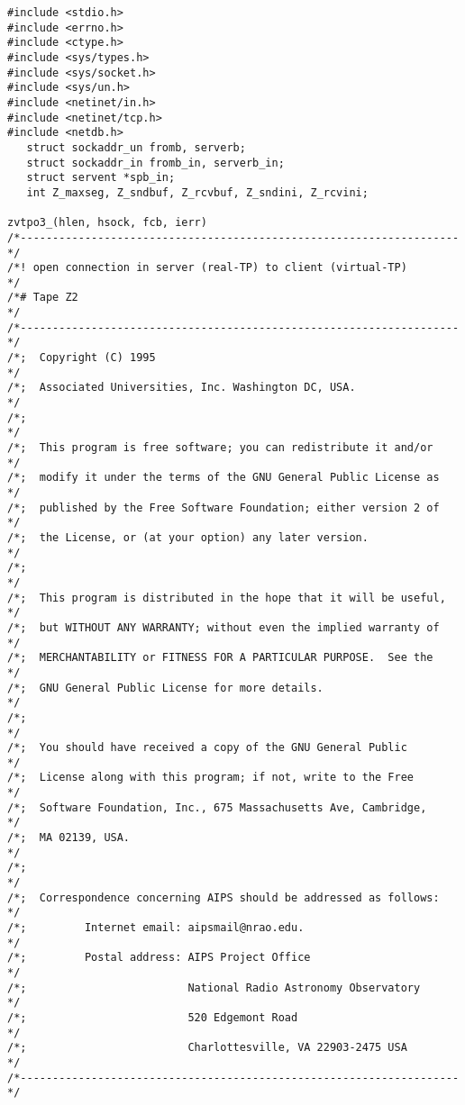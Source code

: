 \begin{center}
\begin{verbatim}
#include <stdio.h>
#include <errno.h>
#include <ctype.h>
#include <sys/types.h>
#include <sys/socket.h>
#include <sys/un.h>
#include <netinet/in.h>
#include <netinet/tcp.h>
#include <netdb.h>
   struct sockaddr_un fromb, serverb;
   struct sockaddr_in fromb_in, serverb_in;
   struct servent *spb_in;
   int Z_maxseg, Z_sndbuf, Z_rcvbuf, Z_sndini, Z_rcvini;

zvtpo3_(hlen, hsock, fcb, ierr)
/*--------------------------------------------------------------------*/
/*! open connection in server (real-TP) to client (virtual-TP)        */
/*# Tape Z2                                                           */
/*--------------------------------------------------------------------*/
/*;  Copyright (C) 1995                                               */
/*;  Associated Universities, Inc. Washington DC, USA.                */
/*;                                                                   */
/*;  This program is free software; you can redistribute it and/or    */
/*;  modify it under the terms of the GNU General Public License as   */
/*;  published by the Free Software Foundation; either version 2 of   */
/*;  the License, or (at your option) any later version.              */
/*;                                                                   */
/*;  This program is distributed in the hope that it will be useful,  */
/*;  but WITHOUT ANY WARRANTY; without even the implied warranty of   */
/*;  MERCHANTABILITY or FITNESS FOR A PARTICULAR PURPOSE.  See the    */
/*;  GNU General Public License for more details.                     */
/*;                                                                   */
/*;  You should have received a copy of the GNU General Public        */
/*;  License along with this program; if not, write to the Free       */
/*;  Software Foundation, Inc., 675 Massachusetts Ave, Cambridge,     */
/*;  MA 02139, USA.                                                   */
/*;                                                                   */
/*;  Correspondence concerning AIPS should be addressed as follows:   */
/*;         Internet email: aipsmail@nrao.edu.                        */
/*;         Postal address: AIPS Project Office                       */
/*;                         National Radio Astronomy Observatory      */
/*;                         520 Edgemont Road                         */
/*;                         Charlottesville, VA 22903-2475 USA        */
/*--------------------------------------------------------------------*/

\end{verbatim}
\end{center}
